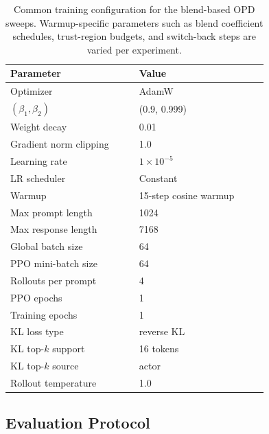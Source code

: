 \documentclass[11pt]{article}
\begin{document}
\begin{table}[h]
\centering
\small
\setlength{\tabcolsep}{5pt}
\begin{tabular}{p{0.42\linewidth}p{0.42\linewidth}}
\toprule
Parameter & Value \\
\midrule
Optimizer & AdamW \citep{adamw} \\
$(\beta_1, \beta_2)$ & (0.9, 0.999) \\
Weight decay & 0.01 \\
Gradient norm clipping & 1.0 \\
Learning rate & $1 \times 10^{-5}$ \\
LR scheduler & Constant \\
Warmup & 15-step cosine warmup \\
Max prompt length & 1024 \\
Max response length & 7168 \\
Global batch size & 64 \\
PPO mini-batch size & 64 \\
Rollouts per prompt & 4 \\
PPO epochs & 1 \\
Training epochs & 1 \\
KL loss type & reverse KL  \\
KL top-$k$ support & 16 tokens \\
KL top-$k$ source & actor \\
Rollout temperature & 1.0 \\
\bottomrule
\end{tabular}
\caption{Common training configuration for the blend-based OPD sweeps. Warmup-specific parameters such as blend coefficient schedules, trust-region budgets, and switch-back steps are varied per experiment.}
\label{tab:training-hparams}
\end{table}

\subsection{Evaluation Protocol}
\end{document}
